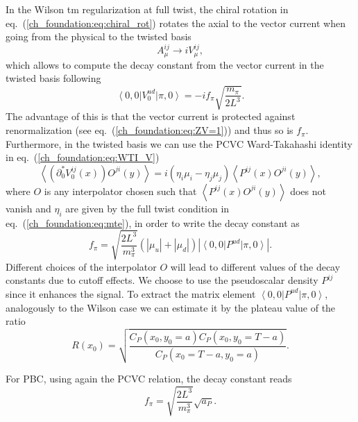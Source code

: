 In the Wilson tm regularization at full twist, the chiral rotation in eq.~(\ref{ch_foundation:eq:chiral_rot}) rotates the axial to the vector current when going from the physical to the twisted basis
\begin{equation}
A_{\mu}^{ij}\rightarrow iV_{\mu}^{ij},
\end{equation}
which allows to compute the decay constant from the vector current in the twisted basis following
\begin{equation}
\label{ch_observables:eq:vector_matrix_element}
\left<0,0\right|V_0^{ud}\left|\pi,0\right>=-if_{\pi}\sqrt{\frac{m_{\pi}}{2L^3}}.
\end{equation}
The advantage of this is that the vector current is protected against renormalization (see eq.~(\ref{ch_foundation:eq:ZV=1})) and thus so is $f_{\pi}$. Furthermore, in the twisted basis we can use the PCVC Ward-Takahashi identity in eq.~(\ref{ch_foundation:eq:WTI_V})
\begin{equation}
\left<\left(\partial_0^*V_0^{ij}(x)\right)O^{ji}(y)\right>=i\left(\eta_i\mu_i-\eta_{j}\mu_{j}\right)\left<P^{ij}(x)O^{ji}(y)\right>,
\end{equation}
where $O$ is any interpolator chosen such that $\left<P^{ij}(x)O^{ji}(y)\right>$ does not vanish and $\eta_i$ are given by the full twist condition in eq.~(\ref{ch_foundation:eq:mte}), in order to write the decay constant as
\begin{equation}
\label{ch_observables:eq:f_OBC}
f_{\pi}=\sqrt{\frac{2L^3}{m_{\pi}^3}}\left(|\mu_u|+|\mu_{d}|\right)\left|\left<0,0\right|P^{ud}\left|\pi,0\right>\right|.
\end{equation}
Different choices of the interpolator $O$ will lead to different values of the decay constants due to cutoff effects. We choose to use the pseudoscalar density $P^{ij}$ since it enhances the signal. To extract the matrix element $\left<0,0\right|P^{ud}\left|\pi,0\right>$, analogously to the Wilson case we can estimate it by the plateau value of the ratio
\begin{equation}
\label{ch_observables:eq:R_tm}
R(x_0)=\sqrt{\frac{C_P(x_0,y_0=a)C_P(x_0,y_0=T-a)}{C_P(x_0=T-a,y_0=a)}}.
\end{equation}

For PBC, using again the PCVC relation, the decay constant reads
\begin{equation}
\label{ch_observables:eq:f_PBC}
f_{\pi}=\sqrt{\frac{2L^3}{m_{\pi}^3}}\sqrt{a_P}.
\end{equation}

